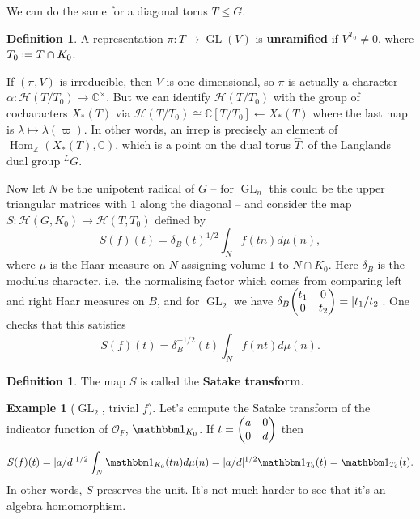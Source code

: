 \documentclass[11pt]{report}
\let\mc\mathcal
\newcommand{\1}{\mathbbm 1}
\newcommand{\Z}{\mathbb{Z}}
\newcommand{\C}{\mathbb{C}}
\renewcommand{\O}{\mc O}
\newcommand*{\defeq}{\mathrel{\vcenter{\baselineskip0.5ex \lineskiplimit0pt
      \hbox{\scriptsize.}\hbox{\scriptsize.}}}%
  =}
\DeclareMathOperator{\GL}{GL}
\DeclareMathOperator{\Hom}{Hom}
\theoremstyle{plain}
\newcounter{ex}
\theoremstyle{definition}
\newtheorem{mydef}[thm]{Definition}
\newtheorem{example}[thm]{Example}
\theoremstyle{remark}
\numberwithin{equation}{section}
\begin{document}
We can do the same for a diagonal torus  $T \le G$.
\begin{mydef}
  A representation $\pi \colon T \to \GL(V)$ is \textbf{unramified} if
  $V^{T_{0}} \ne 0$, where $T_{0}\defeq T \cap K_{0}$.
\end{mydef}

If $(\pi,V)$ is irreducible, then $V$ is one-dimensional, so $\pi$ is
actually a character $\alpha \colon \mc H(T/T_{0}) \to \C^{\times}$. But we can
identify $\mc H(T/T_{0})$ with the group of cocharacters $X_{*}(T)$
via $\mc H(T/T_{0}) \cong \C[T/T_{0}] \gets X_{*}(T)$ where the last map is
$\lambda \mapsto \lambda(\varpi)$. In other words, an irrep is precisely an element of
$\Hom_{\Z}(X_{*}(T),\C)$, which is a point on the dual torus $\hat T$, of
the Langlands dual group ${}^{L}G$.

Now let $N$ be the unipotent radical of $G$ -- for $\GL_{n}$ this could be the upper triangular matrices with $1$ along the diagonal --  and consider the map $S \colon \mc H(G,K_{0}) \to \mc H(T,T_{0})$ defined by
\begin{equation}
  \label{eq:satake}
  S(f)(t) = \delta_{B}(t)^{1/2} \int_{N} f(tn)d\mu(n),
\end{equation}
where $\mu$ is the Haar measure on $N$ assigning volume $1$ to
$N \cap K_{0}$.  Here $\delta_{B}$ is the modulus character, i.e.~the
normalising factor which comes from comparing left and right Haar
measures on $B$, and for $\GL_{2}$ we have
$\delta_{B}\mqty(t_{1} & 0 \\ 0 & t_{2}) = |t_{1}/t_{2}|$. One checks that
this satisfies
\begin{equation}
    S(f)(t) = \delta_{B}^{-1/2}(t)\int_{N}f(nt)d\mu(n).
\end{equation}
  
\begin{mydef}
  The map $S$ is called the \textbf{Satake transform}.
\end{mydef}

\begin{example}[$\GL_{2}$, trivial $f$]
  Let's compute the Satake transform of the indicator function of
  $\O_{F}$, $\1_{K_{0}}$. If $t = \mqty(a  & 0 \\ 0 & d)$ then
  \begin{equation}
    \label{eq:satake-trivial}
    S(f) (t) = |a/d|^{1/2} \int_{N}\1_{K_{0}}(tn)d\mu(n) = |a/d|^{1/2}\1_{T_{0}}(t) = \1_{T_{0}}(t).
  \end{equation}
  In other words, $S$ preserves the unit. It's not much harder to see
  that it's an algebra homomorphism.
\end{example}
\end{document}
